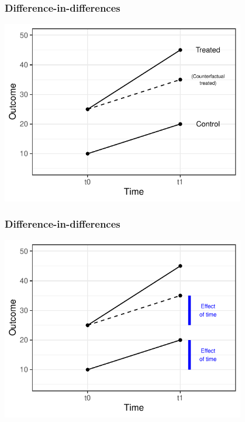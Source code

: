 \documentclass[aspectratio=43]{beamer}
\begin{document}
\begin{frame}
\frametitle{Difference-in-differences}
\centering

\includegraphics[width = 0.8\textwidth]{../img/did3}

\end{frame}

\begin{frame}
\frametitle{Difference-in-differences}
\centering

\includegraphics[width = 0.8\textwidth]{../img/did4}

\end{frame}
\end{document}
